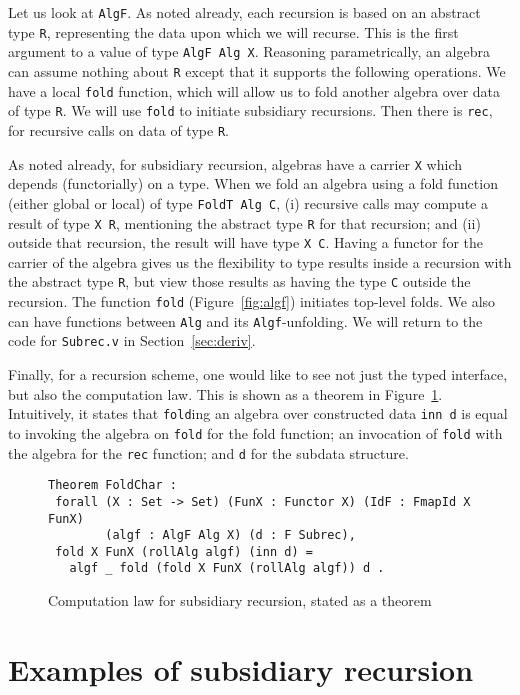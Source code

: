\documentclass[a4paper,USenglish]{lipics-v2021}
\begin{document}
Let us look at \verb|AlgF|.  As noted already, each recursion is based
on an abstract type \verb|R|, representing the data upon which we will
recurse.  This is the first argument to a value of type
\verb|AlgF Alg X|.  Reasoning parametrically, an algebra can assume
nothing about \verb|R| except that it supports the following
operations.  We have a local
\texttt{fold} function, which will allow us to fold another algebra over data
of type \verb|R|.  We will use \verb|fold| to initiate subsidiary
recursions.  Then there is \verb|rec|, for recursive calls on data of
type \verb|R|.

As noted already, for subsidiary recursion, algebras have a carrier
\verb|X| which depends (functorially) on a type.  When we fold an
algebra using a fold function (either global or local) of type
\verb|FoldT Alg C|, (i) recursive calls may compute a result of type
\verb|X R|, mentioning the abstract type \verb|R| for that recursion;
and (ii) outside that recursion, the result will have type \verb|X C|.
Having a functor for the carrier of the algebra gives us the
flexibility to type results inside a recursion with the abstract type
\verb|R|, but view those results as having the type \verb|C| outside
the recursion.  The function \verb|fold| (Figure~\ref{fig:algf}) initiates
top-level folds.  We also can have functions 
between \verb|Alg| and its \verb|Algf|-unfolding.  We will
return to the code for \verb|Subrec.v| in Section~\ref{sec:deriv}.

Finally, for a recursion scheme, one would like to see not just the
typed interface, but also the computation law.  This is shown as a
theorem in Figure~\ref{fig:comp}.  Intuitively, it states that
\verb|fold|ing an algebra over constructed data \verb|inn d| is equal
to invoking the algebra on \verb|fold|
for the fold function; an invocation of \verb|fold| with the algebra
for the \verb|rec| function; and \verb|d| for the subdata structure.

\begin{figure}
\begin{verbatim}
Theorem FoldChar :
 forall (X : Set -> Set) (FunX : Functor X) (IdF : FmapId X FunX)
        (algf : AlgF Alg X) (d : F Subrec),
 fold X FunX (rollAlg algf) (inn d) =
   algf _ fold (fold X FunX (rollAlg algf)) d .
\end{verbatim}
\caption{Computation law for subsidiary recursion, stated as a theorem}
\label{fig:comp}
\end{figure}

\section{Examples of subsidiary recursion}
\label{sec:examples}
\end{document}
